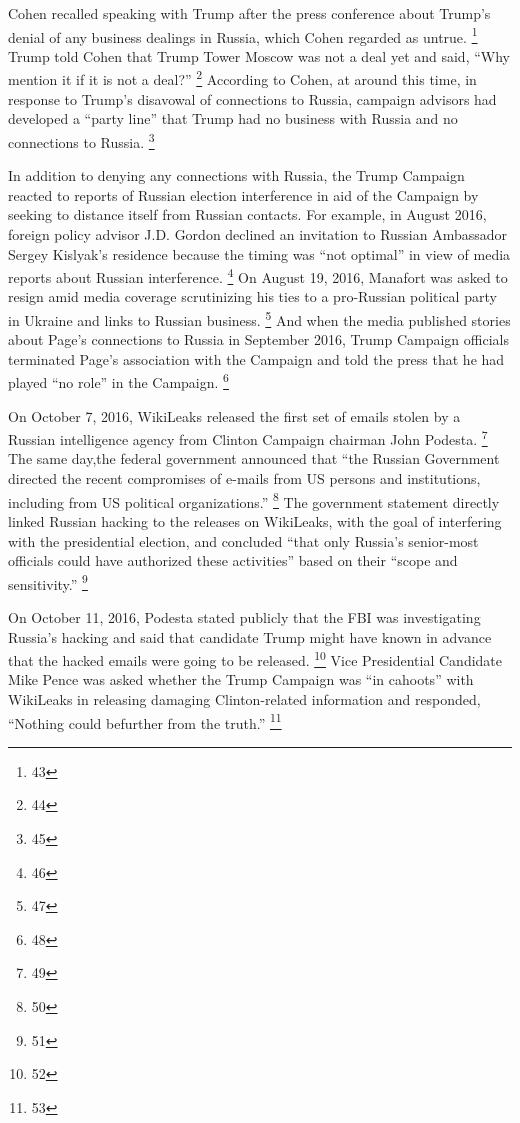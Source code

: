 Cohen recalled speaking with Trump after the press conference about Trump's denial of any business dealings in Russia, which Cohen regarded as untrue.%
\footnote{43}
Trump told Cohen that Trump Tower Moscow was not a deal yet and said, ``Why mention it  if it is not a deal?''%
\footnote{44}
According to Cohen, at around this time, in response to Trump's disavowal of connections to Russia, campaign advisors had developed a ``party line'' that Trump had no business with Russia and no connections to Russia.%
\footnote{45}

In addition to denying any connections with Russia, the Trump Campaign reacted to reports of Russian election interference in aid of the Campaign by seeking to distance itself from Russian contacts.
For example, in August 2016, foreign policy advisor J.D. Gordon declined an invitation to Russian Ambassador Sergey Kislyak's residence because the timing was ``not optimal'' in view of media reports about Russian interference.%
\footnote{46}
On August 19, 2016, Manafort was asked to resign amid media coverage scrutinizing his ties to a pro-Russian political party in Ukraine and links to Russian business.%
\footnote{47}
And when the media published stories about Page's connections to Russia in September 2016, Trump Campaign officials terminated Page's association with the Campaign and told the press that he had played ``no role'' in the Campaign.%
\footnote{48}

On October 7, 2016, WikiLeaks released the first set of emails stolen by a Russian intelligence agency from Clinton Campaign chairman John Podesta.%
\footnote{49}
The same day,the federal government announced that ``the Russian Government directed the recent compromises of e-mails from US persons and institutions, including from US political organizations.''%
\footnote{50}
The government statement directly linked Russian hacking to the releases on WikiLeaks, with the goal of interfering with the presidential election, and concluded ``that only Russia's senior-most officials could have authorized these activities'' based on their ``scope and sensitivity.''%
\footnote{51}

On October 11, 2016, Podesta stated publicly that the FBI was investigating Russia's hacking and said that candidate Trump might have known in advance that the hacked emails were going to be released.%
\footnote{52}
Vice Presidential Candidate Mike Pence was asked whether the Trump Campaign was ``in cahoots'' with WikiLeaks in releasing damaging Clinton-related information and responded, ``Nothing could befurther from the truth.''%
\footnote{53}

